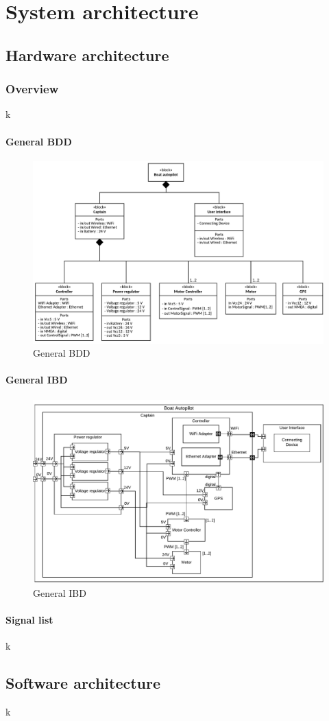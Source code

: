 \chapter{System architecture}

\section{Hardware architecture}
\subsection{Overview}
k

\subsubsection{General BDD}
\begin{figure}[H]
	\centering
	\includegraphics[width=1\linewidth]{Images/General_BDD}
	\caption{General BDD}
	\label{fig:generalbdd}
\end{figure}


\subsubsection{General IBD}
\begin{figure}[H]
	\centering
	\includegraphics[width=1\linewidth]{Images/General_IBD}
	\caption{General IBD}
	\label{fig:generalibd}
\end{figure}

\subsubsection{Signal list}
k

\section{Software architecture}
k

